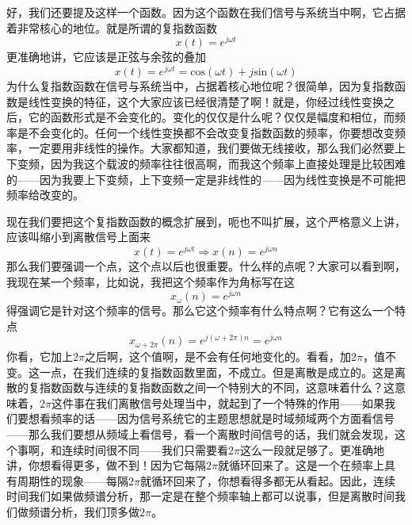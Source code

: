 \documentclass[a4paper,12pt]{article}
\begin{document}
好，我们还要提及这样一个函数。因为这个函数在我们信号与系统当中啊，它占据着非常核心的地位。就是所谓的复指数函数
\begin{equation}
    x(t) = e^{j\omega t} 
\end{equation}
更准确地讲，它应该是正弦与余弦的叠加
\begin{equation}
    x(t) = e^{j\omega t} =\text{cos}(\omega t) + j \text{sin}(\omega t)
\end{equation}
为什么复指数函数在信号与系统当中，占据着核心地位呢？很简单，因为复指数函数是线性变换的特征，这个大家应该已经很清楚了啊！就是，你经过线性变换之后，它的函数形式是不会变化的。变化的仅仅是什么呢？仅仅是幅度和相位，而频率是不会变化的。任何一个线性变换都不会改变复指数函数的频率，你要想改变频率，一定要用非线性的操作。大家都知道，我们要做无线接收，那么我们必然要上下变频，因为我这个载波的频率往往很高啊，而我这个频率上直接处理是比较困难的——因为我要上下变频，上下变频一定是非线性的——因为线性变换是不可能把频率给改变的。

现在我们要把这个复指数函数的概念扩展到，呃也不叫扩展，这个严格意义上讲，应该叫缩小到离散信号上面来
\begin{equation}
    x(t) = e^{j\omega t} \Longrightarrow x(n) = e^{j\omega n}
\end{equation}
那么我们要强调一个点，这个点以后也很重要。什么样的点呢？大家可以看到啊，我现在某一个频率，比如说，我把这个频率作为角标写在这
\begin{equation}
    x_{\omega}(n) = e^{j\omega n}
\end{equation}
得强调它是针对这个频率的信号。那么它这个频率有什么特点啊？它有这么一个特点
\begin{equation}
    x_{\omega+2\pi}(n) = e^{j(\omega+2\pi) n}=e^{j\omega n}
\end{equation}
你看，它加上$2\pi$之后啊，这个值啊，是不会有任何地变化的。看看，加$2\pi$，值不变。这一点，在我们连续的复指数函数里面，不成立。但是离散是成立的。这是离散的复指数函数与连续的复指数函数之间一个特别大的不同，这意味着什么？这意味着，$2\pi$这件事在我们离散信号处理当中，就起到了一个特殊的作用——如果我们要想看频率的话——因为信号系统它的主题思想就是时域频域两个方面看信号——那么我们要想从频域上看信号，看一个离散时间信号的话，我们就会发现，这个事啊，和连续时间很不同——我们只需要看$2\pi$这么一段就足够了。更准确地讲，你想看得更多，做不到！因为它每隔$2\pi$就循环回来了。这是一个在频率上具有周期性的现象——每隔$2\pi$就循环回来了，你想看得多都无从看起。因此，连续时间我们如果做频谱分析，那一定是在整个频率轴上都可以说事，但是离散时间我们做频谱分析，我们顶多做$2\pi$。
\end{document}
